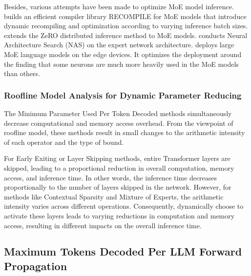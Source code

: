 Besides, various attempts have been made to optimize MoE model inference. \cite{kossmann2022optimizing} builds an efficient compiler library RECOMPILE for MoE models that introduce dynamic recompiling and optimization according to varying inference batch sizes. \cite{rajbhandari2022deepspeed} extends the ZeRO distributed inference method to MoE models. \cite{jawahar2023automoe} conducts Neural Architecture Search (NAS) on the expert network architecture. \cite{yi2023edgemoe} deploys large MoE language models on the edge devices. It optimizes the deployment around the finding that some neurons are much more heavily used in the MoE models than others. 

\subsubsection{Roofline Model Analysis for Dynamic Parameter Reducing}


The Minimum Parameter Used Per Token Decoded methods simultaneously decrease computational and memory access overhead. From the viewpoint of roofline model, these methods result in small changes to the arithmetic intensity of each operator and the type of bound.

For Early Exiting or Layer Skipping methods, entire Transformer layers are skipped, leading to a proportional reduction in overall computation, memory access, and inference time. In other words, the inference time decreases proportionally to the number of layers skipped in the network.
However, for methods like Contextual Sparsity and Mixture of Experts, the arithmetic intensity varies across different operations. Consequently, dynamically choose to activate these layers leads to varying reductions in computation and memory access, resulting in different impacts on the overall inference time.


\subsection{Maximum Tokens Decoded Per LLM Forward Propagation} 
\label{fixedparameter}

